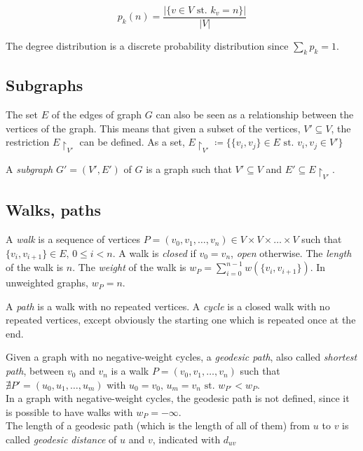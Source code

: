 \documentclass[a4paper,11pt,twoside,openright]{memoir}
\newcommand{\st}{\text{ st. }}
\begin{document}
\begin{equation*}
p_k(n) = \frac{\left\vert{ \{v \in V \st k_v = n\} }\right\vert}{|V|}
\end{equation*}

The degree distribution is a discrete probability distribution since
$\sum_{k} p_k = 1$.

\subsection{Subgraphs}\label{subgraphs}

The set $E$ of the edges of graph $G$ can also be seen as a relationship
between the vertices of the graph. This means that given a subset of the
vertices, $V' \subseteq V$, the restriction $E\restriction_{V'}$ can be
defined. As a set, $E\restriction_{V'} \coloneqq
\{\{v_i, v_j\} \in E \st v_i,v_j \in V'\}$

A \emph{subgraph} $G' = (V', E')$ of $G$ is a graph such that
$V' \subseteq V$ and $E' \subseteq E\restriction_{V'}$.

\subsection{Walks, paths}\label{walks-paths}

A \emph{walk} is a sequence of vertices
$P = (v_0, v_1, \ldots, v_n) \in V \times V \times \ldots \times V$ such
that $\{v_i, v_{i+1}\} \in E,\, 0 \leq i < n$. A walk is \emph{closed} if
$v_0 = v_n$, \emph{open} otherwise. The \emph{length} of the walk is
$n$. The \emph{weight} of the walk is
$w_P = \sum_{i=0}^{n-1} w(\{v_i, v_{i+1}\})$. In unweighted graphs, $w_P = n$.

A \emph{path} is a walk with no repeated vertices. A \emph{cycle} is a
closed walk with no repeated vertices, except obviously the starting one
which is repeated once at the end.

Given a graph with no negative-weight cycles, a \emph{geodesic path},
also called \emph{shortest path}, between $v_0$ and $v_n$ is a walk
$P = (v_0, v_1, \ldots, v_n)$ such that
$\nexists P' = (u_0, u_1, \ldots, u_m)$ with
$u_0 = v_0,\, u_m = v_n \st w_{P'} < w_P$.\\
In a graph with negative-weight cycles, the
geodesic path is not defined, since it is possible to have walks with
$w_P = -\infty$.\\
The length of a geodesic path (which is the length of
all of them) from $u$ to $v$ is called \emph{geodesic distance} of $u$
and $v$, indicated with $d_{uv}$
\end{document}
